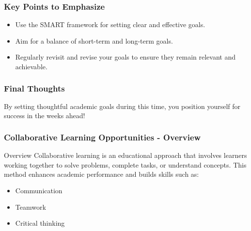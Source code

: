 \documentclass[aspectratio=169]{beamer}
\begin{document}
\begin{frame}[fragile]
    \frametitle{Key Points to Emphasize}
    \begin{itemize}
        \item Use the SMART framework for setting clear and effective goals.
        \item Aim for a balance of short-term and long-term goals.
        \item Regularly revisit and revise your goals to ensure they remain relevant and achievable.
    \end{itemize}
\end{frame}

\begin{frame}[fragile]
    \frametitle{Final Thoughts}
    By setting thoughtful academic goals during this time, you position yourself for success in the weeks ahead!
\end{frame}

\begin{frame}[fragile]
    \frametitle{Collaborative Learning Opportunities - Overview}
    \begin{block}{Overview}
        Collaborative learning is an educational approach that involves learners working together to solve problems, complete tasks, or understand concepts. 
        This method enhances academic performance and builds skills such as:
        \begin{itemize}
            \item Communication
            \item Teamwork
            \item Critical thinking
        \end{itemize}
    \end{block}
\end{frame}
\end{document}
